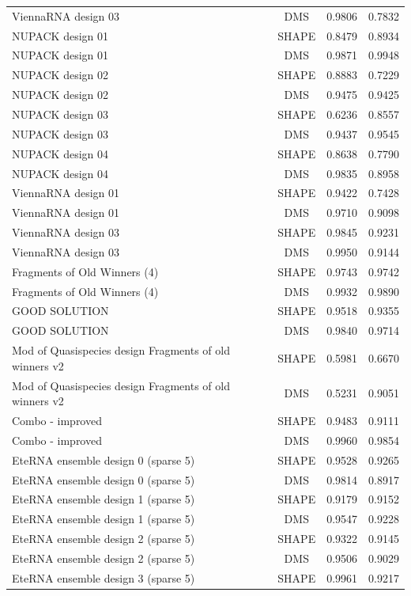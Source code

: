 \documentclass[letter]{bioinfo}
\begin{document}
\begin{center}
\begin{longtable}{lccc}
ViennaRNA design 03	&	DMS	&	0.9806 	&	0.7832 	\\
NUPACK design 01	&	SHAPE	&	0.8479 	&	0.8934 	\\
NUPACK design 01	&	DMS	&	0.9871 	&	0.9948 	\\
NUPACK design 02	&	SHAPE	&	0.8883 	&	0.7229 	\\
NUPACK design 02	&	DMS	&	0.9475 	&	0.9425 	\\
NUPACK design 03	&	SHAPE	&	0.6236 	&	0.8557 	\\
NUPACK design 03	&	DMS	&	0.9437 	&	0.9545 	\\
NUPACK design 04	&	SHAPE	&	0.8638 	&	0.7790 	\\
NUPACK design 04	&	DMS	&	0.9835 	&	0.8958 	\\
ViennaRNA design 01	&	SHAPE	&	0.9422 	&	0.7428 	\\
ViennaRNA design 01	&	DMS	&	0.9710 	&	0.9098 	\\
ViennaRNA design 03	&	SHAPE	&	0.9845 	&	0.9231 	\\
ViennaRNA design 03	&	DMS	&	0.9950 	&	0.9144 	\\
Fragments of Old Winners (4)	&	SHAPE	&	0.9743 	&	0.9742 	\\
Fragments of Old Winners (4)	&	DMS	&	0.9932 	&	0.9890 	\\
GOOD SOLUTION	&	SHAPE	&	0.9518 	&	0.9355 	\\
GOOD SOLUTION	&	DMS	&	0.9840 	&	0.9714 	\\
Mod of Quasispecies design Fragments of old winners v2	&	SHAPE	&	0.5981 	 &	0.6670 	\\
Mod of Quasispecies design Fragments of old winners v2	&	DMS	&	0.5231 	&	 0.9051 	\\
Combo - improved	&	SHAPE	&	0.9483 	&	0.9111 	\\
Combo - improved	&	DMS	&	0.9960 	&	0.9854 	\\
EteRNA ensemble design 0 (sparse 5)	&	SHAPE	&	0.9528 	&	0.9265 	\\
EteRNA ensemble design 0 (sparse 5)	&	DMS	&	0.9814 	&	0.8917 	\\
EteRNA ensemble design 1 (sparse 5)	&	SHAPE	&	0.9179 	&	0.9152 	\\
EteRNA ensemble design 1 (sparse 5)	&	DMS	&	0.9547 	&	0.9228 	\\
EteRNA ensemble design 2 (sparse 5)	&	SHAPE	&	0.9322 	&	0.9145 	\\
EteRNA ensemble design 2 (sparse 5)	&	DMS	&	0.9506 	&	0.9029 	\\
EteRNA ensemble design 3 (sparse 5)	&	SHAPE	&	0.9961 	&	0.9217 	\\

\end{longtable}
\end{center}
\end{document}
